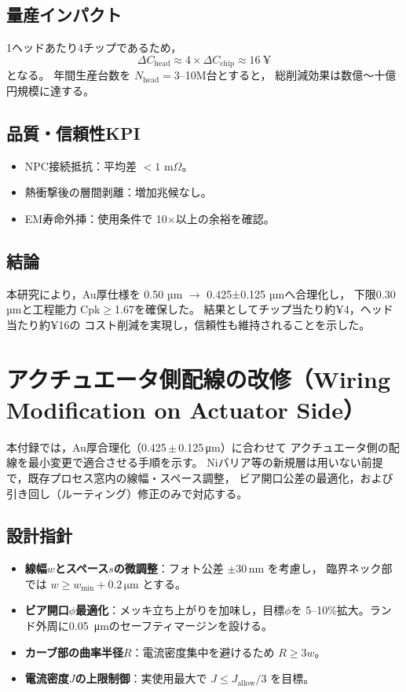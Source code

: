 \documentclass[conference]{IEEEtran}
\begin{document}
\subsection{量産インパクト}
1ヘッドあたり4チップであるため，
\[
 \Delta C_{\mathrm{head}} \approx 4 \times \Delta C_{\mathrm{chip}} \approx 16\ \text{¥}
\]
となる。  
年間生産台数を $N_{\mathrm{head}}=3$--10M台とすると，
総削減効果は数億〜十億円規模に達する。

\subsection{品質・信頼性KPI}
\begin{itemize}
  \item NPC接続抵抗：平均差 $<1$ m$\Omega$。
  \item 熱衝撃後の層間剥離：増加兆候なし。
  \item EM寿命外挿：使用条件で 10$\times$以上の余裕を確認。
\end{itemize}

\subsection{結論}
本研究により，Au厚仕様を
0.50 µm $\rightarrow$ 0.425±0.125 µmへ合理化し，
下限0.30 µmと工程能力 Cpk$\geq$1.67を確保した。
結果としてチップ当たり約¥4，ヘッド当たり約¥16の
コスト削減を実現し，信頼性も維持されることを示した。

\appendices
\section{アクチュエータ側配線の改修（Wiring Modification on Actuator Side）}

本付録では，Au厚合理化（0.425\,$\pm$\,0.125\,\si{\micro\metre}）に合わせて
アクチュエータ側の配線を最小変更で適合させる手順を示す。
Niバリア等の新規層は用いない前提で，既存プロセス窓内の線幅・スペース調整，
ビア開口公差の最適化，および引き回し（ルーティング）修正のみで対応する。

\subsection{設計指針}
\begin{itemize}
  \item \textbf{線幅$w$とスペース$s$の微調整}：フォト公差 $\pm30$\,nm を考慮し，
        臨界ネック部では $w\geq w_{\min}+0.2\,\si{\micro\metre}$ とする。
  \item \textbf{ビア開口$\phi$最適化}：メッキ立ち上がりを加味し，目標$\phi$を
        5--10\%拡大。ランド外周に\SI{0.05}{\micro\metre}のセーフティマージンを設ける。
  \item \textbf{カーブ部の曲率半径$R$}：電流密度集中を避けるため $R\geq 3w$。
  \item \textbf{電流密度$J$の上限制御}：実使用最大で $J\leq J_{\text{allow}}/3$ を目標。
\end{itemize}
\end{document}
